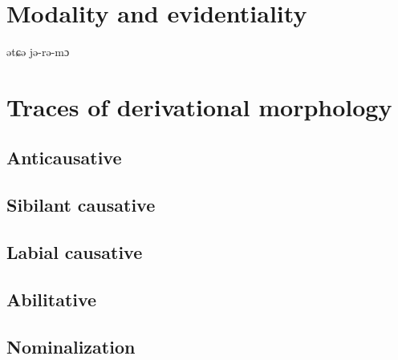 \documentclass[oneside,a4paper,11pt]{article}
\newcommand{\ipa}[1]{{\phon#1}} %
\begin{document}
 \section{Modality and evidentiality}
 
 \citet{jacques09tangutverb}
 \ipa{ətɕə} \ipa{jə-rə-mɔ}
 

 \section{Traces of derivational morphology}

\subsection{Anticausative}

\subsection{Sibilant causative}

\subsection{Labial causative}

\subsection{Abilitative}

\subsection{Nominalization}

\phon


\end{document}
